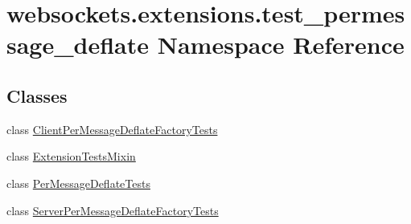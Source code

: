 \hypertarget{namespacewebsockets_1_1extensions_1_1test__permessage__deflate}{}\section{websockets.\+extensions.\+test\+\_\+permessage\+\_\+deflate Namespace Reference}
\label{namespacewebsockets_1_1extensions_1_1test__permessage__deflate}
\subsection*{Classes}
\begin{DoxyCompactItemize}
\item 
class \hyperlink{classwebsockets_1_1extensions_1_1test__permessage__deflate_1_1_client_per_message_deflate_factory_tests}{Client\+Per\+Message\+Deflate\+Factory\+Tests}
\item 
class \hyperlink{classwebsockets_1_1extensions_1_1test__permessage__deflate_1_1_extension_tests_mixin}{Extension\+Tests\+Mixin}
\item 
class \hyperlink{classwebsockets_1_1extensions_1_1test__permessage__deflate_1_1_per_message_deflate_tests}{Per\+Message\+Deflate\+Tests}
\item 
class \hyperlink{classwebsockets_1_1extensions_1_1test__permessage__deflate_1_1_server_per_message_deflate_factory_tests}{Server\+Per\+Message\+Deflate\+Factory\+Tests}
\end{DoxyCompactItemize}
